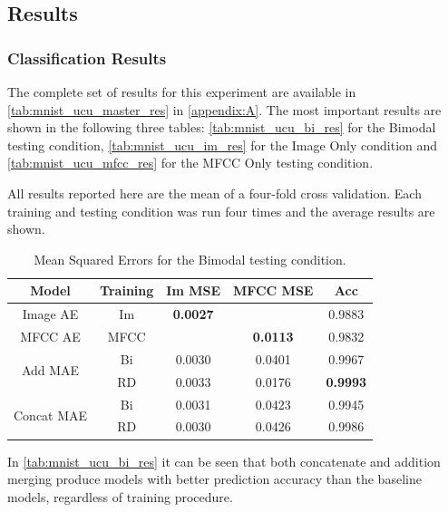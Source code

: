 \begin{table}
	\end{table}




\subsection{Results}

\subsubsection{Classification Results}
The complete set of results for this experiment are available in \autoref{tab:mnist_ucu_master_res} in \autoref{appendix:A}. The most important results are shown in the following three tables: \autoref{tab:mnist_ucu_bi_res} for the Bimodal testing condition, \autoref{tab:mnist_ucu_im_res} for the Image Only condition and \autoref{tab:mnist_ucu_mfcc_res} for the MFCC Only testing condition. 

All results reported here are the mean of a four-fold cross validation. Each training and testing condition was run four times and the average results are shown.


\begin{table}[h]
	\centering
		\begin{tabular}{|c|c|c|c|c|}
		\hline
		Model & Training & Im MSE & MFCC MSE &  Acc \\ \hline
				Image AE & Im & 	\textbf{0.0027}	&	       			& 	0.9883			\\ \hline		
				MFCC AE & MFCC & 		    		& 	\textbf{0.0113} &	0.9832			\\ \hline		
\multirow{2}{*}{Add MAE} & Bi & 	0.0030			&	0.0401			&	0.9967			\\ \cline{2-5}
						  & RD &	0.0033			&	0.0176			&	\textbf{0.9993}	\\ \hline	
		
\multirow{2}{*}{Concat MAE} & Bi & 0.0031			&	0.0423			&	0.9945			\\ \cline{2-5}		
							 & RD & 0.0030			&	0.0426			&	0.9986			\\ \hline
		\end{tabular}
		\caption{Mean Squared Errors for the Bimodal testing condition.}
		\label{tab:mnist_ucu_bi_res}

\end{table}

In \autoref{tab:mnist_ucu_bi_res} it can be seen that both concatenate and addition merging produce models with better prediction accuracy than the baseline models, regardless of training procedure.

